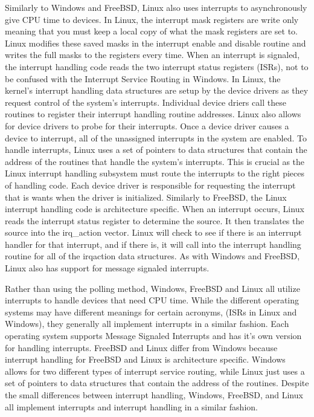 \documentclass[letterpaper,10pt,draftclsnofoot,onecolumn,titlepage]{IEEEtran}
\begin{document}
			Similarly to Windows and FreeBSD, Linux also uses interrupts to asynchronously give CPU time to devices. \cite{Linux}
			In Linux, the interrupt mask registers are write only meaning that you must keep a local copy of what the mask registers are set to.
			Linux modifies these saved masks in the interrupt enable and disable routine and writes the full masks to the registers every time.
			When an interrupt is signaled, the interrupt handling code reads the two interrupt status registers (ISRs), not to be confused with the Interrupt Service Routing in Windows.
			In Linux, the kernel's interrupt handling data structures are setup by the device drivers as they request control of the system's interrupts.
			Individual device driers call these routines to register their interrupt handling routine addresses.
			Linux also allows for device drivers to probe for their interrupts. Once a device driver causes a device to interrupt, all of the unassigned interrupts in the system are enabled.
			To handle interrupts, Linux uses a set of pointers to data structures that contain the address of the routines that handle the system's interrupts.
			This is crucial as the Linux interrupt handling subsystem must route the interrupts to the right pieces of handling code.
			Each device driver is responsible for requesting the interrupt that is wants when the driver is initialized.
			Similarly to FreeBSD, the Linux interrupt handling code is architecture specific.
			When an interrupt occurs, Linux reads the interrupt status register to determine the source. It then translates the source into the irq\_action vector.
			Linux will check to see if there is an interrupt handler for that interrupt, and if there is, it will call into the interrupt handling routine for all of the irqaction data structures.
			As with Windows and FreeBSD, Linux also has support for message signaled interrupts.


			Rather than using the polling method, Windows, FreeBSD and Linux all utilize interrupts to handle devices that need CPU time.
			While the different operating systems may have different meanings for certain acronyms, (ISRs in Linux and Windows), they generally all implement interrupts in a similar fashion.
			Each operating system supports Message Signaled Interrupts and has it's own version for handling interrupts.
			FreeBSD and Linux differ from Windows because interrupt handling for FreeBSD and Linux is architecture specific.
			Windows allows for two different types of interrupt service routing, while Linux just uses a set of pointers to data structures that contain the address of the routines.
			Despite the small differences between interrupt handling, Windows, FreeBSD, and Linux all implement interrupts and interrupt handling in a similar fashion.
\end{document}
